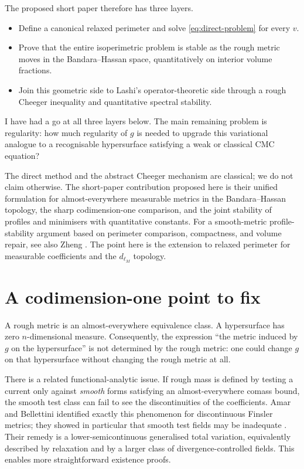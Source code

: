 \documentclass[11pt]{amsart}
\theoremstyle{definition}
\theoremstyle{remark}
\begin{document}
The proposed short paper therefore has three layers.

\begin{itemize}
\item Define a canonical relaxed perimeter and solve
  \eqref{eq:direct-problem} for every $v$.
\item Prove that the entire isoperimetric problem is stable as the rough
  metric moves in the Bandara--Hassan space, quantitatively on interior volume
  fractions.
\item Join this geometric side to Lashi's operator-theoretic side through a
  rough Cheeger inequality and quantitative spectral stability.
\end{itemize}

I have had a go at all three layers below.  The main remaining problem is regularity: how much regularity of $g$ is needed to
upgrade this variational analogue to a recognisable hypersurface satisfying a
weak or classical CMC equation?

The direct method and the abstract Cheeger mechanism are classical; we do not
claim otherwise.  The short-paper contribution proposed here is their unified
formulation for almost-everywhere measurable metrics in the
Bandara--Hassan topology, the sharp codimension-one comparison, and the joint
stability of profiles and minimisers with quantitative constants.
For a smooth-metric profile-stability argument based on perimeter comparison,
compactness, and volume repair, see also Zheng \cite{Zheng2020}.  The point here
is the extension to relaxed perimeter for measurable coefficients and the
$d_{\ell_M}$ topology.

\section{A codimension-one point to fix}

A rough metric is an almost-everywhere equivalence class.  A hypersurface has
zero $n$-dimensional measure.  Consequently, the expression ``the metric
induced by $g$ on the hypersurface'' is not determined by the rough metric:
one could change $g$ on that hypersurface without changing the rough metric at
all.

There is a related functional-analytic issue.
If rough mass is defined by testing a current only against \emph{smooth}
forms satisfying an almost-everywhere comass bound, the smooth test class can
fail to see the discontinuities of the coefficients.  Amar and Bellettini
identified exactly this phenomenon for discontinuous Finsler metrics; they
showed in particular that smooth test fields may be inadequate
\cite{AmarBellettini1994}.  Their remedy is a lower-semicontinuous generalised
total variation, equivalently described by relaxation and by a larger class
of divergence-controlled fields.
This enables more straightforward existence proofs.
\end{document}
